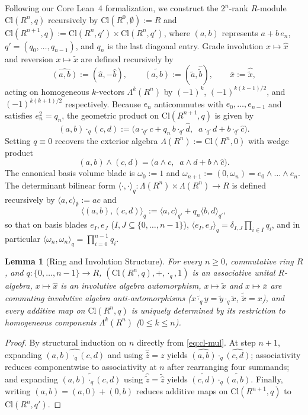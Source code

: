\documentclass[11pt]{article}
\newtheorem{lemma}[theorem]{Lemma}
\theoremstyle{definition}
\newcommand{\Cl}{\mathrm{Cl}}
\begin{document}
Following our Core Lean~4 formalization, we construct the $2^n$-rank $R$-module $\Cl(R^n, q)$ recursively by $\Cl(R^0, \emptyset) := R$ and $\Cl(R^{n+1}, q) := \Cl(R^n, q') \times \Cl(R^n, q')$, where $(a, b)$ represents $a + b\,e_n$, $q' = (q_0,\dots,q_{n-1})$, and $q_n$ is the last diagonal entry. Grade involution $x \mapsto \hat{x}$ and reversion $x \mapsto \widetilde{x}$ are defined recursively by
\[
  \widehat{(a,b)} := (\hat{a}, -\hat{b}), \qquad \widetilde{(a,b)} := (\widetilde{a}, \widehat{\widetilde{b}}), \qquad \overline{x} := \widehat{\widetilde{x}},
\]
acting on homogeneous $k$-vectors $\Lambda^k(R^n)$ by $(-1)^k$, $(-1)^{k(k-1)/2}$, and $(-1)^{k(k+1)/2}$ respectively. Because $e_n$ anticommutes with $e_0,\dots,e_{n-1}$ and satisfies $e_n^2 = q_n$, the geometric product on $\Cl(R^{n+1}, q)$ is given by
\begin{equation}\label{eq:cl-mul}
  (a, b)\cdot_q (c, d) := \bigl(a\cdot_{q'} c + q_n\, b\cdot_{q'} \hat{d},\;\; a\cdot_{q'} d + b\cdot_{q'} \hat{c}\bigr).
\end{equation}
Setting $q \equiv 0$ recovers the exterior algebra $\Lambda(R^n) := \Cl(R^n, 0)$ with wedge product
\[
  (a, b) \wedge (c, d) = \bigl(a \wedge c,\;\; a \wedge d + b \wedge \hat{c}\bigr).
\]
The canonical basis volume blade is $\omega_0 := 1$ and $\omega_{n+1} := (0, \omega_n) = e_0 \wedge \dots \wedge e_n$. The determinant bilinear form $\langle \cdot, \cdot \rangle_q : \Lambda(R^n) \times \Lambda(R^n) \to R$ is defined recursively by $\langle a, c \rangle_\emptyset := ac$ and
\[
  \bigl\langle (a,b), (c,d) \bigr\rangle_q := \langle a, c \rangle_{q'} + q_n \langle b, d \rangle_{q'},
\]
so that on basis blades $e_I, e_J$ ($I, J \subseteq \{0,\dots,n-1\}$), $\langle e_I, e_J \rangle_q = \delta_{I,J} \prod_{i \in I} q_i$, and in particular $\langle \omega_n, \omega_n \rangle_q = \prod_{i=0}^{n-1} q_i$.

\begin{lemma}[Ring and Involution Structure]\label{lem:ring}
For every $n \ge 0$, commutative ring $R$, and $q : \{0,\dots,n-1\} \to R$, $(\Cl(R^n, q), +, \cdot_q, 1)$ is an associative unital $R$-algebra, $x \mapsto \hat{x}$ is an involutive algebra automorphism, $x \mapsto \widetilde{x}$ and $x \mapsto \overline{x}$ are commuting involutive algebra anti-automorphisms ($\widetilde{x\cdot_q y} = \widetilde{y}\cdot_q \widetilde{x}$, $\widetilde{\widetilde{x}} = x$), and every additive map on $\Cl(R^n, q)$ is uniquely determined by its restriction to homogeneous components $\Lambda^k(R^n)$ ($0 \le k \le n$).
\end{lemma}
\begin{proof}
By structural induction on $n$ directly from \eqref{eq:cl-mul}. At step $n+1$, expanding $\widehat{(a,b)\cdot_q(c,d)}$ and using $\hat{\hat{z}} = z$ yields $\widehat{(a,b)}\cdot_q\widehat{(c,d)}$; associativity reduces componentwise to associativity at $n$ after rearranging four summands; and expanding $\widetilde{(a,b)\cdot_q(c,d)}$ using $\widehat{\widetilde{z}} = \widetilde{\hat{z}}$ yields $\widetilde{(c,d)}\cdot_q\widetilde{(a,b)}$. Finally, writing $(a,b) = (a,0) + (0,b)$ reduces additive maps on $\Cl(R^{n+1},q)$ to $\Cl(R^n,q')$.
\end{proof}
\end{document}
